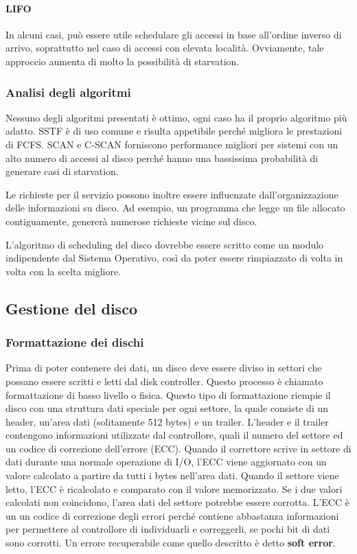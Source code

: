 \documentclass[a4paper]{article}
\begin{document}
\paragraph{LIFO} In alcuni casi, può essere utile schedulare gli accessi in base all'ordine inverso di arrivo, soprattutto nel caso di accessi con elevata località. Ovviamente, tale approccio aumenta di molto la possibilità di starvation.

\subsubsection{Analisi degli algoritmi}
Nessuno degli algoritmi presentati è ottimo, ogni caso ha il proprio algoritmo più adatto. SSTF è di uso comune e risulta appetibile perché migliora le prestazioni di FCFS. SCAN e C-SCAN forniscono performance migliori per sistemi con un alto numero di accessi al disco perché hanno una bassissima probabilità di generare casi di starvation.

Le richieste per il servizio possono inoltre essere influenzate dall'organizzazione delle informazioni su disco. Ad esempio, un programma che legge un file allocato contiguamente, genererà numerose richieste vicine sul disco.

L'algoritmo di scheduling del disco dovrebbe essere scritto come un modulo indipendente dal Sistema Operativo, così da poter essere rimpiazzato di volta in volta con la scelta migliore.

\subsection{Gestione del disco}

\subsubsection{Formattazione dei dischi}
Prima di poter contenere dei dati, un disco deve essere diviso in settori che possano essere scritti e letti dal disk controller. Questo processo è chiamato formattazione di basso livello o fisica. Questo tipo di formattazione riempie il disco con una struttura dati speciale per ogni settore, la quale consiste di un header, un'area dati (solitamente 512 bytes) e un trailer. L'header e il trailer contengono informazioni utilizzate dal controllore, quali il numero del settore ed un codice di correzione dell'errore (ECC). Quando il correttore scrive in settore di dati durante una normale operazione di I/O, l'ECC viene aggiornato con un valore calcolato a partire da tutti i bytes nell'area dati. Quando il settore viene letto, l'ECC è ricalcolato e comparato con il valore memorizzato. Se i due valori calcolati non coincidono, l'area dati del settore potrebbe essere corrotta. L'ECC è un un codice di correzione degli errori perché contiene abbastanza informazioni per permettere al controllore di individuarli e correggerli, se pochi bit di dati sono corrotti. Un errore recuperabile come quello descritto è detto \textbf{soft error}.
\end{document}
